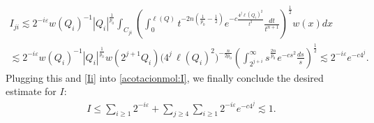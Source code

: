 \documentclass[11pt, a4paper,leqno]{amsart}
\theoremstyle{plain}
\theoremstyle{definition}
\theoremstyle{remark}
\numberwithin{equation}{section}
\begin{document}
\begin{multline*}
I_{ji}
\lesssim 2^{-i\varepsilon}
w(Q_i)^{-1}|Q_i|^{\frac{1}{p_0}}
\int_{C_{ji}}\left(\int_{0}^{\ell(Q)}
t^{-2n\left(\frac{1}{p_0}-\frac{1}{2}\right)}e^{-c\frac{4^j\ell(Q_i)^2}{t^2}}
\frac{dt}{t^{n+1}}\right)^{\frac{1}{2}}w(x)dx
\\
\lesssim
2^{-i\varepsilon}
w(Q_i)^{-1}|Q_i|^{\frac{1}{p_0}}w(2^{j+1}Q_i)
\big(4^j\,\ell(Q_i)^2)^{-\frac{n}{2p_0}}
\left(\int_{2^{j+i}}^{\infty}s^{\frac{2n}{p_0}}e^{-cs^2}
\frac{d s}{s}\right)^{\frac{1}{2}}
\lesssim 2^{-i\varepsilon}
e^{-c4^{j}}.
\end{multline*}
Plugging this and \eqref{Ii} into \eqref{acotacionmol:I}, we finally conclude the desired estimate for $I$:
\begin{align}\label{acotacionmoleculasI}
I\leq \sum_{i\geq 1}2^{-i\varepsilon}+\sum_{j\geq 4} \sum_{i\geq 1} 2^{-i\varepsilon}
e^{-c4^{j}}\lesssim 1.
\end{align}
\end{document}
